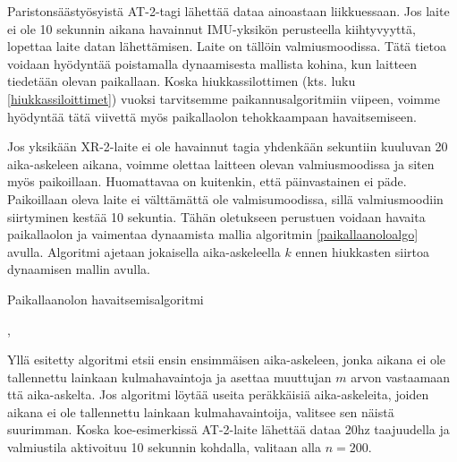 \documentclass[
  12pt,
  a4paper, twoside]{book}
\begin{document}
Paristonsäästyösyistä AT-2-tagi lähettää dataa ainoastaan liikkuessaan. Jos laite ei ole 10 sekunnin aikana havainnut IMU-yksikön perusteella kiihtyvyyttä, lopettaa laite datan lähettämisen. Laite on tällöin valmiusmoodissa. Tätä tietoa voidaan hyödyntää poistamalla dynaamisesta mallista kohina, kun laitteen tiedetään olevan paikallaan. Koska hiukkassilottimen (kts. luku \ref{hiukkassiloittimet}) vuoksi tarvitsemme paikannusalgoritmiin viipeen, voimme hyödyntää tätä viivettä myös paikallaolon tehokkaampaan havaitsemiseen.

Jos yksikään XR-2-laite ei ole havainnut tagia yhdenkään sekuntiin kuuluvan 20 aika-askeleen aikana, voimme olettaa laitteen olevan valmiusmoodissa ja siten myös paikoillaan. Huomattavaa on kuitenkin, että päinvastainen ei päde. Paikoillaan oleva laite ei välttämättä ole valmisumoodissa, sillä valmiusmoodiin siirtyminen kestää 10 sekuntia. Tähän oletukseen perustuen voidaan havaita paikallaolon ja vaimentaa dynaamista mallia algoritmin \ref{paikallaanoloalgo} avulla. Algoritmi ajetaan jokaisella aika-askeleella \(k\) ennen hiukkasten siirtoa dynaamisen mallin avulla.

\begin{algorithm}[H]
\label{paikallaanoloalgo}
\DontPrintSemicolon
\SetAlgoShortEnd
{}
\caption{Paikallaanolon havaitsemisalgoritmi}
\end{algorithm}

,

Yllä esitetty algoritmi etsii ensin ensimmäisen aika-askeleen, jonka aikana ei ole tallennettu lainkaan kulmahavaintoja ja asettaa muuttujan \(m\) arvon vastaamaan ttä aika-askelta. Jos algoritmi löytää useita peräkkäisiä aika-askeleita, joiden aikana ei ole tallennettu lainkaan kulmahavaintoija, valitsee sen näistä suurimman. Koska koe-esimerkissä AT-2-laite lähettää dataa 20hz taajuudella ja valmiustila aktivoituu 10 sekunnin kohdalla, valitaan alla \(n=200\).
\end{document}
